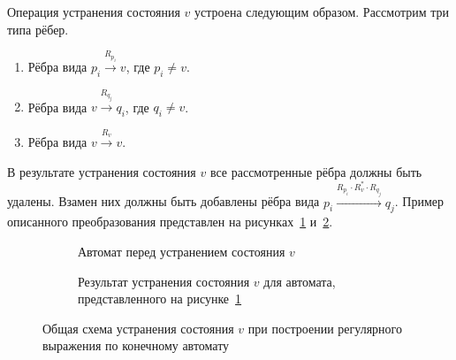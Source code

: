 Операция устранения состояния $v$ устроена следующим образом.
Рассмотрим три типа рёбер.
\begin{enumerate}
    \item Рёбра вида $p_i \xrightarrow{R_{p_i}} v$, где $p_i \neq v$.
    \item Рёбра вида $v \xrightarrow{R_{q_j}} q_i$, где $q_i \neq v$.
    \item Рёбра вида $v \xrightarrow{R_v} v$.
\end{enumerate}

В результате устранения состояния $v$ все рассмотренные рёбра должны быть удалены.
Взамен них должны быть добавлены рёбра вида $p_i \xrightarrow{R_{p_i} \cdot R_v^* \cdot R_{q_j}} q_j$.
Пример описанного преобразования представлен на рисунках~\ref{fig:fa3} и~\ref{fig:fa4}.

\begin{figure}
    \begin{center}
        \begin{subfigure}[b]{0.47\textwidth}
            \begin{center}

                
            \end{center}
            \caption{Автомат перед устранением состояния $v$}
            \label{fig:fa3}

        \end{subfigure}\hspace{5mm}
        \begin{subfigure}[b]{0.47\textwidth}
            \begin{center}

                

            \end{center}

            \caption{Результат устранения состояния $v$ для автомата, представленного на рисунке~\ref{fig:fa3}}
            \label{fig:fa4}
        \end{subfigure}
    \end{center}
    \caption{Общая схема устранения состояния $v$ при построении регулярного выражения по конечному автомату}
    \label{fig:fa_3_4}
\end{figure}

